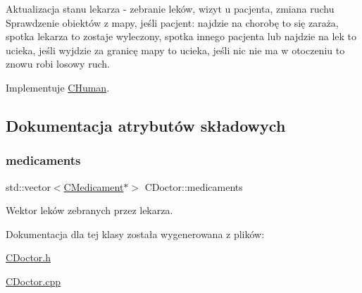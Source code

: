 Aktualizacja stanu lekarza -\/ zebranie leków, wizyt u pacjenta, zmiana ruchu Sprawdzenie obiektów z mapy, jeśli pacjent\+: najdzie na chorobę to się zaraża, spotka lekarza to zostaje wyleczony, spotka innego pacjenta lub najdzie na lek to ucieka, jeśli wyjdzie za granicę mapy to ucieka, jeśli nic nie ma w otoczeniu to znowu robi losowy ruch. 



Implementuje \mbox{\hyperlink{class_c_human_adb7f7d855ace82f7517bb49f465ea5d9}{C\+Human}}.



\subsection{Dokumentacja atrybutów składowych}
\mbox{\label{class_c_doctor_a30c4633b76b836ee395bf707a77fcb37}} 
\subsubsection{\texorpdfstring{medicaments}{medicaments}}
{\footnotesize\ttfamily std\+::vector$<$\mbox{\hyperlink{class_c_medicament}{C\+Medicament}}$\ast$$>$ C\+Doctor\+::medicaments\hspace{0.3cm}{\ttfamily [protected]}}



Wektor leków zebranych przez lekarza. 



Dokumentacja dla tej klasy została wygenerowana z plików\+:\begin{DoxyCompactItemize}
\item 
\mbox{\hyperlink{_c_doctor_8h}{C\+Doctor.\+h}}\item 
\mbox{\hyperlink{_c_doctor_8cpp}{C\+Doctor.\+cpp}}\end{DoxyCompactItemize}
